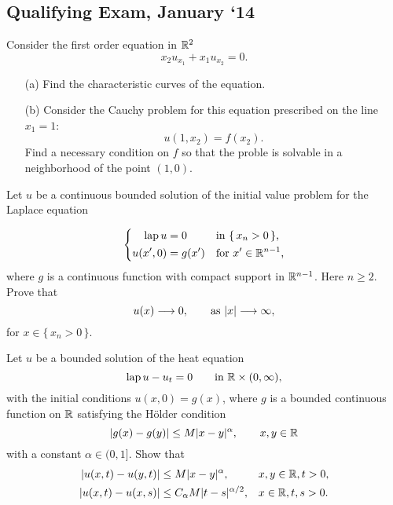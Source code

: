 \subsection{Qualifying Exam, January `14}
\begin{problem}
  Consider the first order equation in \(\mathbb{R}^2\)
  \[
    x_2u_{x_1}+x_1u_{x_2}=0.
  \]
  \begin{itemize}[noitemsep]
  \item[(a)] Find the characteristic curves of the equation.
  \item[(b)] Consider the Cauchy problem for this equation prescribed on
    the line \(x_1=1\):
    \[
      u(1,x_2)=f(x_2).
    \]
    Find a necessary condition on \(f\) so that the proble is solvable in a
    neighborhood of the point \((1,0)\).
  \end{itemize}
\end{problem}
\begin{solution*}
\end{solution*}

\begin{problem}
  Let \(u\) be a continuous bounded solution of the initial value problem
  for the Laplace equation

  \[
    \left\{
      \begin{aligned}
        \operatorname{lap} u&=0&&\text{in \(\{\,x_n>0\,\}\),}\\
        u(x',0)&=g(x')&&\text{for \(x'\in\mathbb{R}^{n-1}\),}
      \end{aligned}
    \right.
  \]
  where \(g\) is a continuous function with compact support in
  \(\mathbb{R}^{n-1}\). Here \(n\geq 2\). Prove that
  \[
    u(x)\To 0,\qquad%
    \text{as } |x|\To \infty,
  \]
  for \(x\in\{\,x_n>0\,\}\).
\end{problem}
\begin{solution*}
\end{solution*}

\begin{problem}
  Let \(u\) be a bounded solution of the heat equation
  \[
    \operatorname{lap} u-u_t=0\qquad\text{in \(\mathbb{R}\times(0,\infty)\),}
  \]
  with the initial conditions \(u(x,0)=g(x)\), where \(g\) is a bounded
  continuous function on \(\mathbb{R}\) satisfying the Hölder condition
  \[
    |g(x)-g(y)|\leq M|x-y|^\alpha,\qquad x,y\in\mathbb{R}
  \]
  with a constant \(\alpha\in (0, 1]\). Show that
  \[
    \begin{aligned}
      |u(x,t)-u(y,t)|&\leq M|x-y|^\alpha,&&x,y\in\mathbb{R},t>0,\\
      |u(x,t)-u(x,s)|&\leq C_\alpha M|t-s|^{\alpha/2},&&x\in\mathbb{R},t,s>0.
    \end{aligned}
  \]

  \noindent [\emph{Hint:} For the last inequality, in the representation
  formula of \(u(x,t)\) as a convolution with the heat kernel
  \(\Phi(y,t)\), make a change of variables \(z=y/\sqrt{t}\) and use that
  $\left|\sqrt{t}-\sqrt{s}\right|\leq\sqrt{|t-s|}$.]
\end{problem}
\begin{solution*}
\end{solution*}

